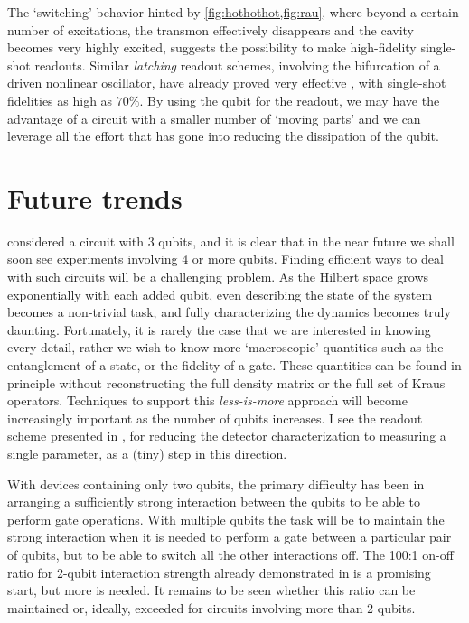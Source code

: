 The `switching' behavior hinted by \cref{fig:hothothot,fig:rau}, where beyond a certain number of excitations, the transmon effectively disappears and the cavity becomes very highly excited, suggests the possibility to make high-fidelity single-shot readouts. Similar \emph{latching} readout schemes, involving the bifurcation of a driven nonlinear oscillator, have already proved very effective \cite{siddiqi_dispersive_2006, boulant_quantum_2007, metcalfe_measuringdecoherence_2007}, with single-shot fidelities as high as $70\%$. By using the qubit for the readout, we may have the advantage of a circuit with a smaller number of `moving parts' and we can leverage all the effort that has gone into reducing the dissipation of the qubit.

\section{Future trends}
 considered a circuit with 3 qubits, and it is clear that in the near future we shall soon see experiments involving 4 or more qubits. Finding efficient ways to deal with such circuits will be a challenging problem. As the Hilbert space grows exponentially with each added qubit, even describing the state of the system becomes a non-trivial task, and fully characterizing the dynamics becomes truly daunting. Fortunately, it is rarely the case that we are interested in knowing every detail, rather we wish to know more `macroscopic' quantities such as the entanglement of a state, or the fidelity of a gate. These quantities can be found in principle without reconstructing the full density matrix or the full set of Kraus operators. Techniques to support this \emph{less-is-more} approach \cite{plenio_physics:_2009} will become increasingly important as the number of qubits increases. I see the readout scheme presented in , for reducing the detector characterization to measuring a single parameter, as a (tiny) step in this direction.

With devices containing only two qubits, the primary difficulty has been in arranging a sufficiently strong interaction between the qubits to be able to perform gate operations. With multiple qubits the task will be to maintain the strong interaction when it is needed to perform a gate between a particular pair of qubits, but to be able to switch all the other interactions off. The 100:1 on-off ratio for 2-qubit interaction strength already demonstrated in \cite{dicarlo_demonstration_2009} is a promising start, but more is needed. It remains to be seen whether this ratio can be maintained or, ideally, exceeded for circuits involving more than 2 qubits.


